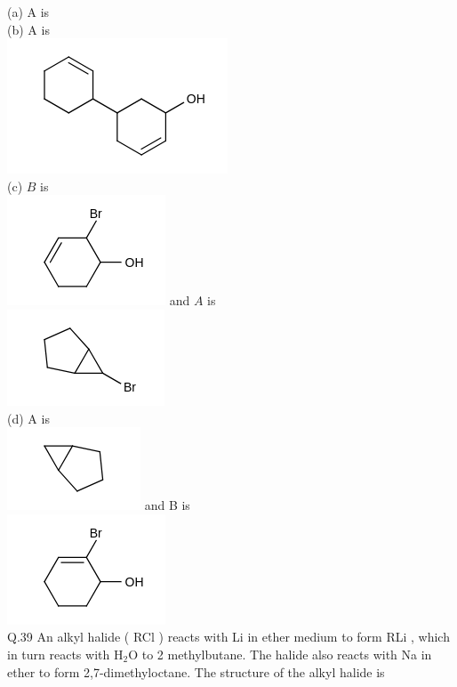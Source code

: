 \documentclass[10pt]{article}
\begin{document}
(a) A is\\
(b) A is\\
\includegraphics{smile-cdde99db3813f4e96143677b82ac3d321dc14a95}\\
(c) $B$ is\\
\includegraphics{smile-ea21280f9f170cf2d6263eae5febe6b8cb6171a6} and $A$ is\\
\includegraphics{smile-022a9a19b8c341f82201d4dbd623ff83cebf7933}\\
(d) A is\\
\includegraphics{smile-7dc6dc84709961d686280573595f5f00e2cc3596} and B is\\
\includegraphics{smile-72eac51e0b5575c1ef3d760b63dbb12ce946ff7c}\\
Q.39 An alkyl halide ( RCl ) reacts with Li in ether medium to form RLi , which in turn reacts with $\mathrm{H}_{2} \mathrm{O}$ to 2 methylbutane. The halide also reacts with Na in ether to form 2,7-dimethyloctane. The structure of the alkyl halide is\\
\end{document}
